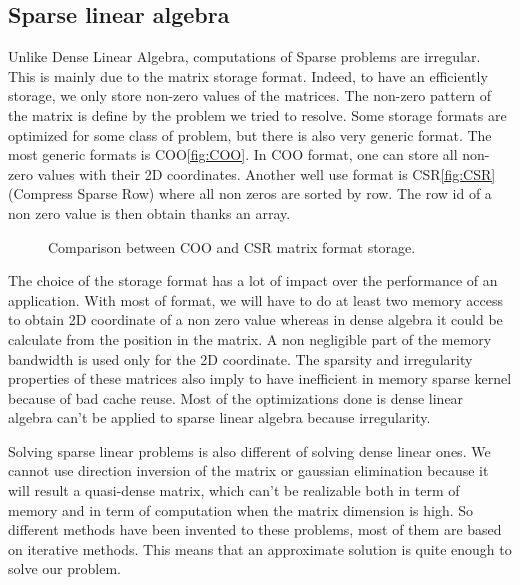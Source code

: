 \subsection{Sparse linear algebra}
Unlike Dense Linear Algebra, computations of Sparse problems are irregular.
%
This is mainly due to the matrix storage format.
%
Indeed, to have an efficiently storage, we only store non-zero values of the matrices.
%
The non-zero pattern of the matrix is define by the problem we tried to resolve.
%
Some storage formats are optimized for some class of problem, but there is also very generic format.
%
The most generic formats is COO\ref{fig:COO}.
%
In COO format, one can store all non-zero values with their 2D coordinates.
%
Another well use format is CSR\ref{fig:CSR} (Compress Sparse Row) where all non zeros are sorted by row.
%
The row id of a non zero value is then obtain thanks an array.

\begin{figure}[!ht]
     \begin{center}
    \end{center}
    \caption{Comparison between COO and CSR matrix format storage.}
    \label{fig:matrix_storage}
\end{figure}

The choice of the storage format has a lot of impact over the performance of an application.
%
With most of format, we will have to do at least two memory access to obtain 2D coordinate of a non zero value whereas in dense algebra it could be calculate from the position in the matrix.
%
A non negligible part of the memory bandwidth is used only for the 2D coordinate.
%
The sparsity and irregularity properties of these matrices also imply to have inefficient in memory sparse kernel because of bad cache reuse.
%
Most of the optimizations done is dense linear algebra can't be applied to sparse linear algebra because irregularity.


Solving sparse linear problems is also different of solving dense linear ones.
%
We cannot use direction inversion of the matrix or gaussian elimination because it will result a quasi-dense matrix, which can't be realizable both in term of memory and in term of computation when the matrix dimension is high.
%
So different methods have been invented to these problems, most of them are based on iterative methods.
%
This means that an approximate solution is quite enough to solve our problem.
